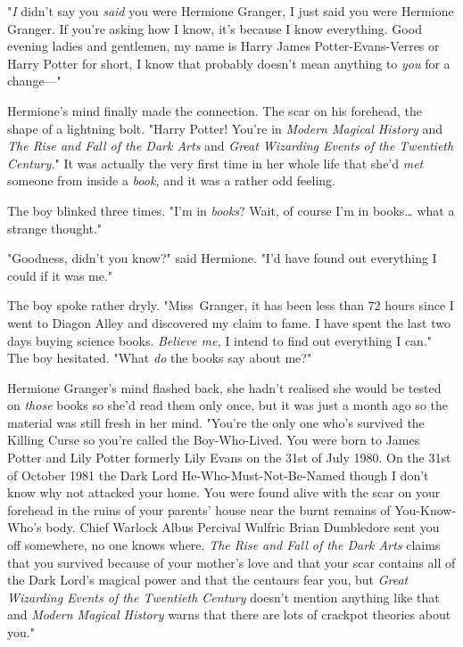 "\emph{I} didn't say you \emph{said} you were Hermione Granger, I just said you
were Hermione Granger. If you're asking how I know, it's because I know
everything. Good evening ladies and gentlemen, my name is Harry James
Potter-Evans-Verres or Harry Potter for short, I know that probably doesn't
mean anything to \emph{you} for a change---"

Hermione's mind finally made the connection. The scar on his forehead, the
shape of a lightning bolt. "Harry Potter! You're in \emph{Modern Magical
History} and \emph{The Rise and Fall of the Dark Arts} and \emph{Great
Wizarding Events of the Twentieth Century.}" It was actually the very first
time in her whole life that she'd \emph{met} someone from inside a \emph{book,}
and it was a rather odd feeling.

The boy blinked three times. "I'm in \emph{books}? Wait, of course I'm in
books{\ldots} what a strange thought."

"Goodness, didn't you know?" said Hermione. "I'd have found out everything I
could if it was me."

The boy spoke rather dryly. "Miss~Granger, it has been less than 72 hours since
I went to Diagon Alley and discovered my claim to fame. I have spent the last
two days buying science books. \emph{Believe me,} I intend to find out
everything I can." The boy hesitated. "What \emph{do} the books say about me?"

Hermione Granger's mind flashed back, she hadn't realised she would be tested
on \emph{those} books so she'd read them only once, but it was just a month ago
so the material was still fresh in her mind. "You're the only one who's
survived the Killing Curse so you're called the Boy-Who-Lived. You were born to
James Potter and Lily Potter formerly Lily Evans on the 31st of July 1980. On
the 31st of October 1981 the Dark Lord He-Who-Must-Not-Be-Named though I don't
know why not attacked your home. You were found alive with the scar on your
forehead in the ruins of your parents' house near the burnt remains of
You-Know-Who's body. Chief Warlock Albus Percival Wulfric Brian Dumbledore sent
you off somewhere, no one knows where. \emph{The Rise and Fall of the Dark
Arts} claims that you survived because of your mother's love and that your scar
contains all of the Dark Lord's magical power and that the centaurs fear you,
but \emph{Great Wizarding Events of the Twentieth Century} doesn't mention
anything like that and \emph{Modern Magical History} warns that there are lots
of crackpot theories about you."

